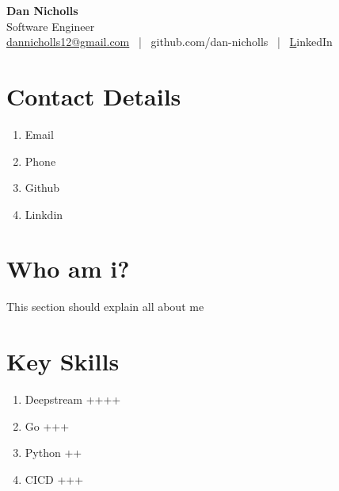 \documentclass[10pt]{article}
\begin{document}
\begin{center}
	{\LARGE \textbf{Dan Nicholls}} \\
	\vspace{0.5em}
	Software Engineer \\
	\href{mailto:dannicholls12@gmail.com}{dannicholls12@gmail.com} ~|~ \href{https://github.com/dan-nicholls}github.com/dan-nicholls ~|~ \href{https://www.linkedin.com/in/dannichollsdev/} LinkedIn
\end{center}

\section{Contact Details}
\begin{enumerate}
	\item Email
	\item Phone 
	\item Github
	\item Linkdin
\end{enumerate}

\section{Who am i?}
This section should explain all about me


\section{Key Skills}
\begin{enumerate}
	\item Deepstream ++++
	\item Go +++
	\item Python ++
	\item CICD +++
\end{enumerate}
\end{document}
